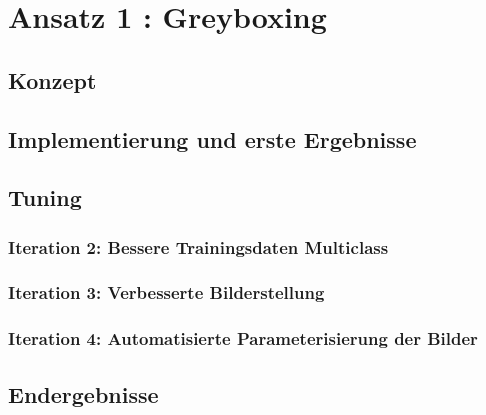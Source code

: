 \chapter{Ansatz 1 : Greyboxing}
\label{Cha:GreyBoxing}
\section{Konzept}

\section{Implementierung und erste Ergebnisse}

\section{Tuning}

\subsection{Iteration 2: Bessere Trainingsdaten Multiclass}

\subsection{Iteration 3: Verbesserte Bilderstellung}

\subsection{Iteration 4: Automatisierte Parameterisierung der Bilder}

\section{Endergebnisse}